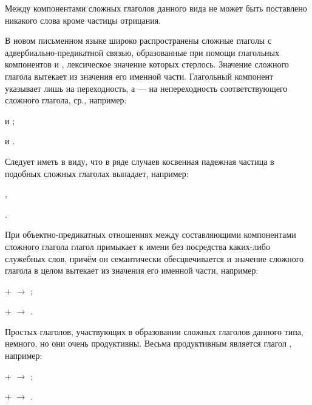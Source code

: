 Между компонентами сложных глаголов данного вида не может быть поставлено никакого слова кроме частицы отрицания.

В новом письменном языке широко распространены сложные глаголы с адвербиально-предикатной связью, образованные при помощи глагольных компонентов  и , лексическое значение которых стерлось. Значение сложного глагола вытекает из значения его именной части. Глагольный компонент  указывает лишь на переходность, а  --- на непереходность соответствующего сложного глагола, ср., например:
\begin{prfsample}
	\item {} и ;
	\item {} и .
\end{prfsample}

Следует иметь в виду, что в ряде случаев косвенная падежная частица в подобных сложных глаголах выпадает, например:
\begin{prfsample}
	\item {},
	\item {}.
\end{prfsample}

При объектно-предикатных отношениях между составляющими компонентами сложного глагола глагол примыкает к имени без посредства каких-либо служебных слов, причём он семантически обесцвечивается и значение сложного глагола в целом вытекает из значения его именной части, например:
\begin{prfsample}
	\item {} +  $\rightarrow$ ;
	\item {} +  $\rightarrow$ .
\end{prfsample}

Простых глаголов, участвующих в образовании сложных глаголов данного типа, немного, но они очень продуктивны. Весьма продуктивным является глагол , например:
\begin{prfsample}
	\item {} +  $\rightarrow$ ;
	\item {} +  $\rightarrow$ .
\end{prfsample}

